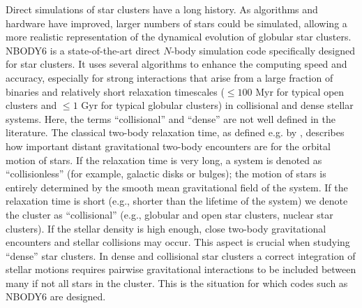\documentclass[usenatbib,aas_macros]{mn2e}
\def\nbody{NBODY6 }
\begin{document}
Direct simulations of star clusters have a long history. 
As algorithms and hardware have improved, larger numbers of stars could be simulated, allowing a more realistic representation of the dynamical evolution of globular star clusters. 
\nbody \citep{Aarseth2003} is a state-of-the-art direct $N$-body simulation code specifically designed for star clusters. 
It uses several algorithms to enhance the computing speed and accuracy, especially for strong interactions that arise from a large fraction of binaries and relatively short relaxation timescales ($\le 100$ Myr for typical open clusters and $\le 1$ Gyr for typical globular clusters) in collisional and dense stellar systems.
Here, the terms ``collisional'' and ``dense'' are not well defined in the literature. 
The classical two-body relaxation time, as defined e.g. by \cite{Chandrasekhar1942,Spitzer1987}, describes how important distant gravitational two-body encounters are for the orbital motion of stars. 
If the relaxation time is very long, a system is denoted as ``collisionless'' (for example, galactic disks or bulges); 
the motion of stars is entirely determined by the smooth mean gravitational field of the system. 
If the relaxation time is short (e.g., shorter than the lifetime of the system) we denote the cluster as ``collisional'' (e.g., globular and open star clusters, nuclear star clusters).
If the stellar density is high enough, close two-body gravitational encounters and stellar collisions may occur.
This aspect is crucial when studying ``dense'' star clusters.
In dense and collisional star clusters a correct integration of stellar motions requires pairwise gravitational interactions to be included between many if not all stars in the cluster.
This is the situation for which codes such as \nbody are designed.
\end{document}
